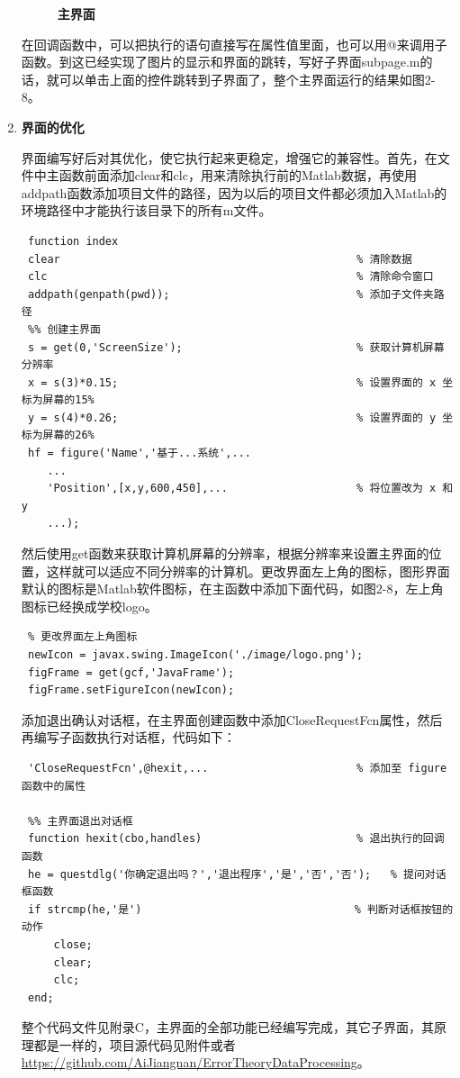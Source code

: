 \begin{enumerate}
\begin{figure}[H]
 	\caption{\textbf{主界面}}
 \end{figure}
 	\qquad 在回调函数中，可以把执行的语句直接写在属性值里面，也可以用@来调用子函数。到这已经实现了图片的显示和界面的跳转，写好子界面subpage.m的话，就可以单击上面的控件跳转到子界面了，整个主界面运行的结果如图2-8。
 	\item	\textbf{界面的优化}
 	
 	\qquad 界面编写好后对其优化，使它执行起来更稳定，增强它的兼容性。首先，在文件中主函数前面添加clear和clc，用来清除执行前的Matlab数据，再使用addpath函数添加项目文件的路径，因为以后的项目文件都必须加入Matlab的环境路径中才能执行该目录下的所有m文件。
 	\begin{lstlisting}
 function index
 clear												% 清除数据
 clc												% 清除命令窗口
 addpath(genpath(pwd));								% 添加子文件夹路径
 %% 创建主界面
 s = get(0,'ScreenSize');							% 获取计算机屏幕分辨率
 x = s(3)*0.15;										% 设置界面的 x 坐标为屏幕的15%
 y = s(4)*0.26;										% 设置界面的 y 坐标为屏幕的26%
 hf = figure('Name','基于...系统',...
 	...
 	'Position',[x,y,600,450],...					% 将位置改为 x 和 y
 	...);\end{lstlisting}
 	\qquad 然后使用get函数来获取计算机屏幕的分辨率，根据分辨率来设置主界面的位置，这样就可以适应不同分辨率的计算机。更改界面左上角的图标，图形界面默认的图标是Matlab软件图标，在主函数中添加下面代码，如图2-8，左上角图标已经换成学校logo。
 	\begin{lstlisting}
 % 更改界面左上角图标
 newIcon = javax.swing.ImageIcon('./image/logo.png');
 figFrame = get(gcf,'JavaFrame');
 figFrame.setFigureIcon(newIcon);\end{lstlisting}
 	\qquad 添加退出确认对话框，在主界面创建函数中添加CloseRequestFcn属性，然后再编写子函数执行对话框，代码如下：
 	\begin{lstlisting}
 'CloseRequestFcn',@hexit,...						% 添加至 figure 函数中的属性
 
 %% 主界面退出对话框
 function hexit(cbo,handles)						% 退出执行的回调函数
 he = questdlg('你确定退出吗？','退出程序','是','否','否');	% 提问对话框函数
 if strcmp(he,'是')								   % 判断对话框按钮的动作
	 close;
	 clear;
	 clc;
 end;\end{lstlisting}
 	\qquad 整个代码文件见附录C，主界面的全部功能已经编写完成，其它子界面，其原理都是一样的，项目源代码见附件或者 \url{https://github.com/AiJiangnan/ErrorTheoryDataProcessing}。
\end{enumerate}